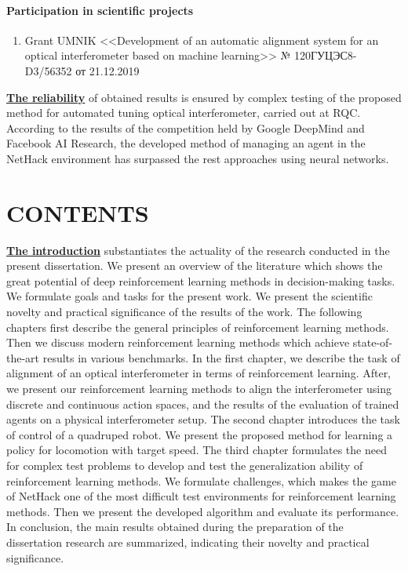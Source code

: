 \paragraph{Participation in scientific projects}
\begin{enumerate}[labelindent=3pt, labelsep=10pt, topsep=10pt, itemsep=5pt]
    \item Grant UMNIK <<Development of an automatic alignment system for an optical interferometer based on machine learning>> № 120ГУЦЭС8-D3/56352 от 21.12.2019

\end{enumerate}


\underline{\textbf{The reliability}} of obtained results is ensured by complex testing of the proposed method for automated tuning optical interferometer, carried out at RQC. According to the results of the competition held by Google DeepMind and Facebook AI Research, the developed method of managing an agent in the NetHack environment has surpassed the rest approaches using neural networks.


\section*{\centering CONTENTS}
\underline{\textbf{The introduction}} substantiates the actuality of the research conducted in the present dissertation. We present an overview of the literature which shows the great potential of deep reinforcement learning methods in decision-making tasks. We formulate goals and tasks for the present work. We present the scientific novelty and practical significance of the results of the work. The following chapters first describe the general principles of reinforcement learning methods. Then we discuss modern reinforcement learning methods which achieve state-of-the-art results in various benchmarks. In the first chapter, we describe the task of alignment of an optical interferometer in terms of reinforcement learning. After, we present our reinforcement learning methods to align the interferometer using discrete and continuous action spaces, and the results of the evaluation of trained agents on a physical interferometer setup. The second chapter introduces the task of control of a quadruped robot. We present the proposed method for learning a policy for locomotion with target speed. The third chapter formulates the need for complex test problems to develop and test the generalization ability of reinforcement learning methods. We formulate challenges, which makes the game of NetHack one of the most difficult test environments for reinforcement learning methods. Then we present the developed algorithm and evaluate its performance. In conclusion, the main results obtained during the preparation of the dissertation research are summarized, indicating their novelty and practical significance.


